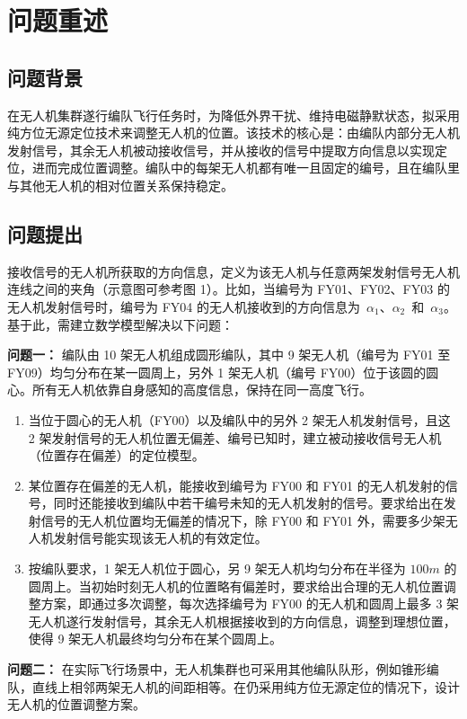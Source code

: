\documentclass[withoutpreface,bwprint]{cumcmthesis} %
\begin{document}
\section{问题重述}

\subsection{问题背景}
在无人机集群遂行编队飞行任务时，为降低外界干扰、维持电磁静默状态，拟采用纯方位无源定位技术来调整无人机的位置。该技术的核心是：由编队内部分无人机发射信号，其余无人机被动接收信号，并从接收的信号中提取方向信息以实现定位，进而完成位置调整。编队中的每架无人机都有唯一且固定的编号，且在编队里与其他无人机的相对位置关系保持稳定。

\subsection{问题提出}
接收信号的无人机所获取的方向信息，定义为该无人机与任意两架发射信号无人机连线之间的夹角（示意图可参考图 1）。比如，当编号为 FY01、FY02、FY03 的无人机发射信号时，编号为 FY04 的无人机接收到的方向信息为 \(\alpha_1\)、\(\alpha_2\) 和 \(\alpha_3\)。基于此，需建立数学模型解决以下问题：

\textbf{问题一：}
编队由 10 架无人机组成圆形编队，其中 9 架无人机（编号为 FY01 至 FY09）均匀分布在某一圆周上，另外 1 架无人机（编号 FY00）位于该圆的圆心。所有无人机依靠自身感知的高度信息，保持在同一高度飞行。

\begin{enumerate}
    \item 当位于圆心的无人机（FY00）以及编队中的另外 2 架无人机发射信号，且这 2 架发射信号的无人机位置无偏差、编号已知时，建立被动接收信号无人机（位置存在偏差）的定位模型。
    \item 某位置存在偏差的无人机，能接收到编号为 FY00 和 FY01 的无人机发射的信号，同时还能接收到编队中若干编号未知的无人机发射的信号。要求给出在发射信号的无人机位置均无偏差的情况下，除 FY00 和 FY01 外，需要多少架无人机发射信号能实现该无人机的有效定位。
    \item 按编队要求，1 架无人机位于圆心，另 9 架无人机均匀分布在半径为 $100m$ 的圆周上。当初始时刻无人机的位置略有偏差时，要求给出合理的无人机位置调整方案，即通过多次调整，每次选择编号为 FY00 的无人机和圆周上最多 3 架无人机遂行发射信号，其余无人机根据接收到的方向信息，调整到理想位置，使得 9 架无人机最终均匀分布在某个圆周上。
\end{enumerate}

\textbf{问题二：}
在实际飞行场景中，无人机集群也可采用其他编队队形，例如锥形编队，直线上相邻两架无人机的间距相等。在仍采用纯方位无源定位的情况下，设计无人机的位置调整方案。
\end{document}
